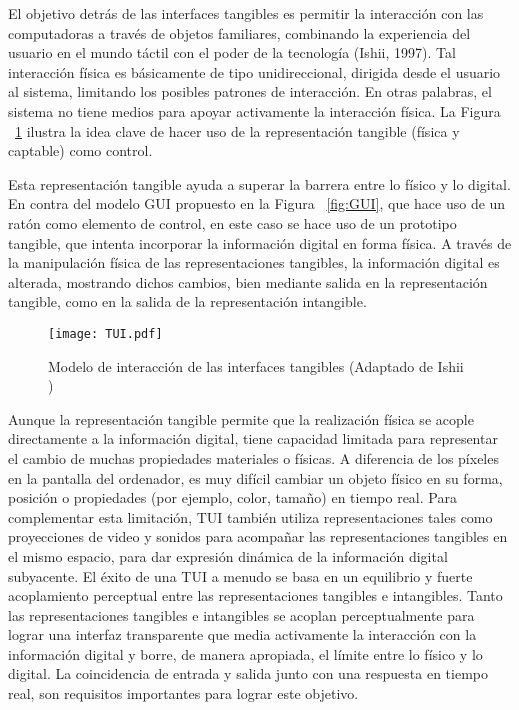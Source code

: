 El objetivo detrás de las interfaces tangibles es permitir la interacción con las computadoras a través de objetos familiares, combinando la experiencia del usuario en el mundo táctil con el poder de la tecnología (Ishii, 1997).
Tal interacción física es básicamente de tipo unidireccional, dirigida desde el usuario al sistema, limitando los posibles patrones de interacción. En otras palabras, el sistema no tiene medios para apoyar activamente la interacción física.
La Figura ~\ref{fig:TUI} ilustra la idea clave de hacer uso de la representación tangible (física y captable) como control.

Esta representación tangible ayuda a superar la barrera entre lo físico y lo digital. En contra del modelo GUI propuesto en la Figura ~\ref{fig:GUI}, que hace uso de un ratón como elemento de control, en este caso se hace uso de un prototipo tangible, que intenta incorporar la información digital en forma física. A través de la manipulación física de las representaciones tangibles, la información digital es alterada, mostrando dichos cambios, bien mediante salida en la representación tangible, como en la salida de la representación intangible.


\begin{figure}[!h]
\begin{center}
\texttt{[image: TUI.pdf]}
\caption{Modelo de interacción de las interfaces tangibles (Adaptado de Ishii \cite{Ishii})}
\label{fig:TUI}
\end{center}
\end{figure}


Aunque la representación tangible permite que la realización física se acople directamente a la información digital, tiene capacidad limitada para representar el cambio de muchas propiedades materiales o físicas. A diferencia de los píxeles en la pantalla del ordenador, es muy difícil cambiar un objeto físico en su forma, posición o propiedades (por ejemplo, color, tamaño) en tiempo real. Para complementar esta limitación, TUI también utiliza representaciones tales como proyecciones de video y sonidos para acompañar las representaciones tangibles en el mismo espacio, para dar expresión dinámica de la información digital subyacente.
El éxito de una TUI a menudo se basa en un equilibrio y fuerte acoplamiento perceptual entre las
representaciones tangibles e intangibles. Tanto las representaciones tangibles e intangibles se acoplan perceptualmente para lograr una interfaz transparente que media activamente la interacción con la información digital y borre, de manera apropiada, el límite entre lo físico y lo digital. La coincidencia de entrada y salida junto con una respuesta en tiempo real, son requisitos importantes para lograr este objetivo.

